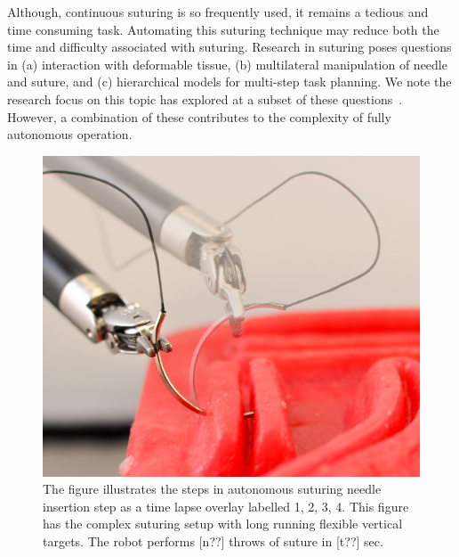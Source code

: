 \documentclass[0-suturing.tex]{subfiles}
\begin{document}

Although, continuous suturing is so frequently used, it remains a tedious and time consuming task. Automating this suturing technique may reduce both the time and difficulty associated with suturing. Research in suturing poses questions in (a) interaction with deformable tissue, (b) multilateral manipulation of needle and suture, and (c) hierarchical models for multi-step task planning. We note the research focus on this topic has explored at a subset of these questions~. However, a combination of these contributes to the complexity of fully autonomous operation.

\begin{figure}[!t]
\centering
\includegraphics[width=0.9\linewidth]{figures/NeedleInsertionCombo}
\caption{ The figure illustrates the steps in autonomous suturing needle insertion step as a time lapse overlay labelled 1, 2, 3, 4. This figure has the complex suturing setup with long running flexible vertical targets. The robot performs [n??] throws of suture in [t??] sec.}
\label{fig:intro}
\vspace{-10pt}
\end{figure}
\end{document}
